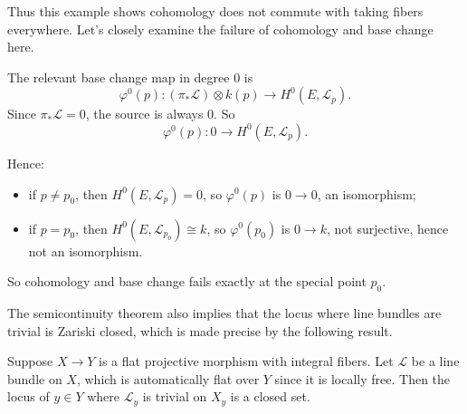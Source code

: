 \documentclass[12pt]{article}
\begin{document}
\begin{example}
    Thus this example shows cohomology does not commute with taking fibers everywhere. Let's closely examine the failure of cohomology and base change here.

    The relevant base change map in degree 0 is
    \[
        \varphi^0(p):(\pi_*\mathcal L)\otimes k(p)\longrightarrow H^0(E,\mathcal L_p).
    \]
    Since $\pi_*\mathcal L=0$, the source is always $0$. So
    \[
        \varphi^0(p): 0\longrightarrow H^0(E,\mathcal L_p).
    \]

    Hence:
    \begin{itemize}
        \item if $p\neq p_0$, then
              $H^0(E,\mathcal L_p)=0$,
              so $\varphi^0(p)$ is
              $0\to 0$,
              an isomorphism;
        \item if $p=p_0$, then
              $H^0(E,\mathcal L_{p_0})\cong k$,
              so $\varphi^0(p_0)$ is
              $0\to k$,
              not surjective, hence not an isomorphism.
    \end{itemize}

    So cohomology and base change fails exactly at the special point $p_0$.

\end{example}

The semicontinuity theorem also implies that the locus where line bundles are trivial is Zariski closed, which is made precise by the following result.

\begin{proposition}
    Suppose \(X \to Y\) is a flat projective morphism with integral fibers. Let \(\mathcal L\) be a line bundle on \(X\), which is automatically flat over \(Y\) since it is locally free. Then the locus of \(y \in Y\) where \(\mathcal L_y\) is trivial on \(X_y\) is a closed set.
\end{proposition}
\end{document}
